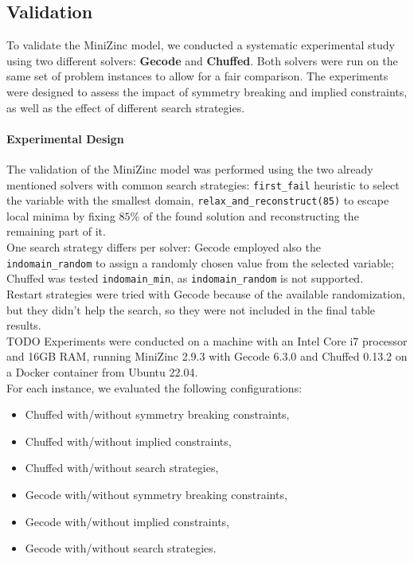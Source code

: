 \documentclass[11pt]{article}
\begin{document}
\begin{itemize}
\subsection{Validation}

To validate the MiniZinc model, we conducted a systematic experimental study using two different solvers: \textbf{Gecode} and \textbf{Chuffed}. Both solvers were run on the same set of problem instances to allow for a fair comparison. The experiments were designed to assess the impact of symmetry breaking and implied constraints, as well as the effect of different search strategies.

\paragraph{Experimental Design}
The validation of the MiniZinc model was performed using the two already mentioned solvers with common search strategies: \texttt{first\_fail} heuristic to select the variable with the smallest domain, \texttt{relax\_and\_reconstruct(85)} to escape local minima by fixing $85\%$ of the found solution and reconstructing the remaining part of it. \\One search strategy differs per solver: Gecode employed also the \texttt{indomain\_random} to assign a randomly chosen value from the selected variable; Chuffed was tested \texttt{indomain\_min}, as \texttt{indomain\_random} is not supported. \\
Restart strategies were tried with Gecode because of the available randomization, but they didn't help the search, so they were not included in the final table results.\\
TODO Experiments were conducted on a machine with an Intel Core i7 processor and 16GB RAM, running MiniZinc 2.9.3 with Gecode 6.3.0 and Chuffed 0.13.2 on a Docker container from Ubuntu 22.04.\\
For each instance, we evaluated the following configurations:
\begin{itemize}
    \item Chuffed with/without symmetry breaking constraints,
    \item Chuffed with/without implied constraints,
    \item Chuffed with/without search strategies,
    \item Gecode with/without symmetry breaking constraints,
    \item Gecode with/without implied constraints,
    \item Gecode with/without search strategies.
\end{itemize}


\end{itemize}
\end{document}
